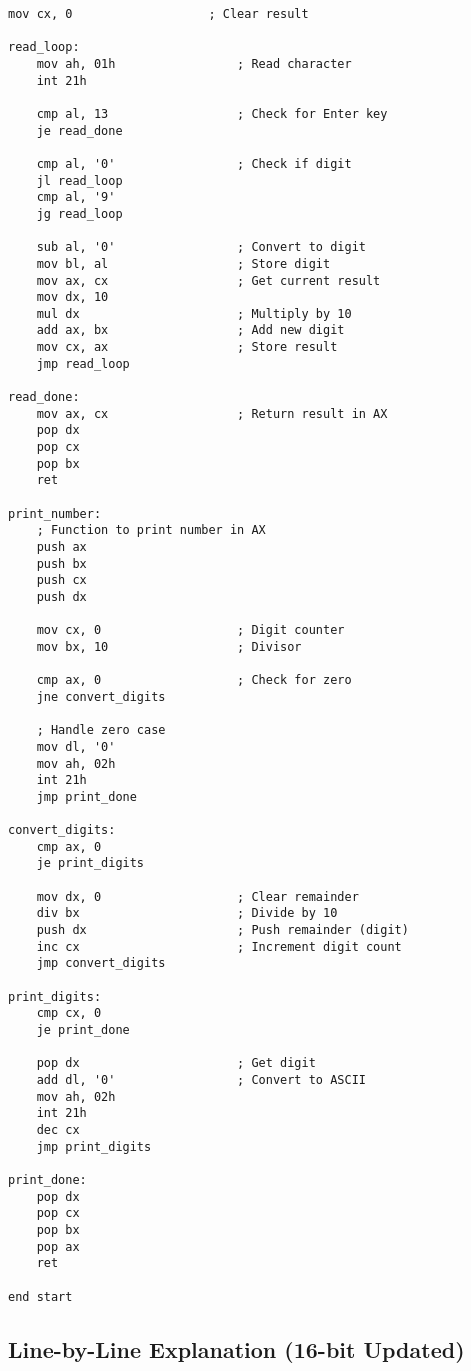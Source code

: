 \documentclass[12pt,a4paper]{article}
\begin{document}
\begin{lstlisting}[caption=16-bit Number Swapping Program with Multi-Digit Support]
    mov cx, 0                   ; Clear result
    
read_loop:
    mov ah, 01h                 ; Read character
    int 21h
    
    cmp al, 13                  ; Check for Enter key
    je read_done
    
    cmp al, '0'                 ; Check if digit
    jl read_loop
    cmp al, '9'
    jg read_loop
    
    sub al, '0'                 ; Convert to digit
    mov bl, al                  ; Store digit
    mov ax, cx                  ; Get current result
    mov dx, 10
    mul dx                      ; Multiply by 10
    add ax, bx                  ; Add new digit
    mov cx, ax                  ; Store result
    jmp read_loop

read_done:
    mov ax, cx                  ; Return result in AX
    pop dx
    pop cx
    pop bx
    ret

print_number:
    ; Function to print number in AX
    push ax
    push bx
    push cx
    push dx
    
    mov cx, 0                   ; Digit counter
    mov bx, 10                  ; Divisor
    
    cmp ax, 0                   ; Check for zero
    jne convert_digits
    
    ; Handle zero case
    mov dl, '0'
    mov ah, 02h
    int 21h
    jmp print_done
    
convert_digits:
    cmp ax, 0
    je print_digits
    
    mov dx, 0                   ; Clear remainder
    div bx                      ; Divide by 10
    push dx                     ; Push remainder (digit)
    inc cx                      ; Increment digit count
    jmp convert_digits
    
print_digits:
    cmp cx, 0
    je print_done
    
    pop dx                      ; Get digit
    add dl, '0'                 ; Convert to ASCII
    mov ah, 02h
    int 21h
    dec cx
    jmp print_digits
    
print_done:
    pop dx
    pop cx
    pop bx
    pop ax
    ret

end start
\end{lstlisting}

\subsection{Line-by-Line Explanation (16-bit Updated)}
\end{document}
